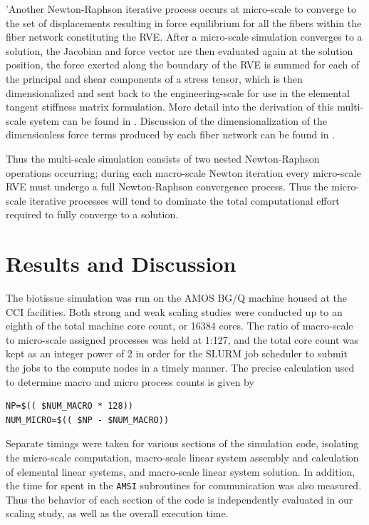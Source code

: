 \documentclass[11pt]{article}
\begin{document}
'Another Newton-Raphson iterative process occurs at micro-scale to converge to the set of displacements resulting in force equilibrium for all the fibers within the fiber network constituting the RVE. After a micro-scale simulation converges to a solution, the Jacobian and force vector are then evaluated again at the solution position, the force exerted along the boundary of the RVE is summed for each of the principal and shear components of a stress tensor, which is then dimensionalized and sent back to the engineering-scale for use in the elemental tangent stiffness matrix formulation. More detail into the derivation of this multi-scale system can be found in \cite{stylianopoulos2008thesis,agoram2001coupled,stylianopoulos2007multiscale} . Discussion of the dimensionalization of the dimensionless force terms produced by each fiber network can be found in \cite{stylianopoulos2007volume,chandran2007deterministic}.

Thus the multi-scale simulation consists of two nested Newton-Raphson operations occurring; during each macro-scale Newton iteration every micro-scale RVE must undergo a full Newton-Raphson convergence process. Thus the micro-scale iterative processes will tend to dominate the total computational effort required to fully converge to a solution.

\section{Results and Discussion}\label{results}
The biotissue simulation was run on the AMOS BG/Q machine housed at the CCI facilities. Both strong and weak scaling studies were conducted up to an eighth of the total machine core count, or 16384 cores. The ratio of macro-scale to micro-scale assigned processes was held at 1:127, and the total core count was kept as an integer power of 2 in order for the SLURM job scheduler to submit the jobs to the compute nodes in a timely manner. The precise calculation used to determine macro and micro process counts is given by
%
\begin{verbatim}
NP=$(( $NUM_MACRO * 128))
NUM_MICRO=$(( $NP - $NUM_MACRO))
\end{verbatim}
\label{macro micro ratio}
%

Separate timings were taken for various sections of the simulation code, isolating the micro-scale computation, macro-scale linear system assembly and calculation of elemental linear systems, and macro-scale linear system solution. In addition, the time for spent in the \verb|AMSI| subroutines for communication was also measured. Thus the behavior of each section of the code is independently evaluated in our scaling study, as well as the overall execution time.
\end{document}
